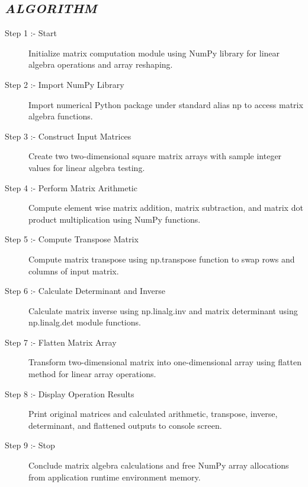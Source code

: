 \documentclass[11pt,a4paper]{article}
\begin{document}
\subsection*{\textit{ALGORITHM}}
\begin{description}
  \item[Step 1 :- Start] Initialize matrix computation module using NumPy library for linear algebra operations and array reshaping.
  \item[Step 2 :- Import NumPy Library] Import numerical Python package under standard alias np to access matrix algebra functions.
  \item[Step 3 :- Construct Input Matrices] Create two two-dimensional square matrix arrays with sample integer values for linear algebra testing.
  \item[Step 4 :- Perform Matrix Arithmetic] Compute element wise matrix addition, matrix subtraction, and matrix dot product multiplication using NumPy functions.
  \item[Step 5 :- Compute Transpose Matrix] Compute matrix transpose using np.transpose function to swap rows and columns of input matrix.
  \item[Step 6 :- Calculate Determinant and Inverse] Calculate matrix inverse using np.linalg.inv and matrix determinant using np.linalg.det module functions.
  \item[Step 7 :- Flatten Matrix Array] Transform two-dimensional matrix into one-dimensional array using flatten method for linear array operations.
  \item[Step 8 :- Display Operation Results] Print original matrices and calculated arithmetic, transpose, inverse, determinant, and flattened outputs to console screen.
  \item[Step 9 :- Stop] Conclude matrix algebra calculations and free NumPy array allocations from application runtime environment memory.
\end{description}
\end{document}
